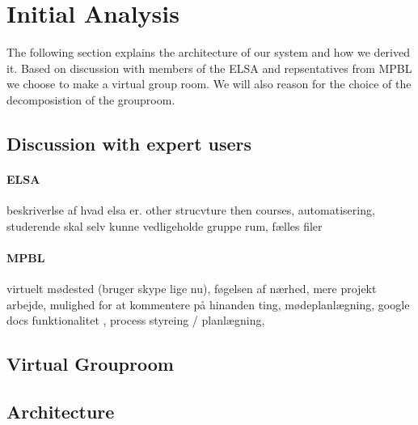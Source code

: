 \section{Initial Analysis}
\begin{comment}
In the preliminary phase of working with Electronic-learning (E-learning) it is important for us to ensure that we are in fact working with problems that are relevant in the E-learning and Problem Based Learning (PBL) fields of study, as we are aiming at improving the overall way that the chosen E-learning environment at Aalborg University (AAU), namely Moodle, supports PBL. Because AAU is renowned for its implementation of PBL, we do not have to look very far to find some of the leading experts in this field.
\end{comment}
The following section explains the architecture of our system and how we derived it. Based on discussion with members of the ELSA \cite{x} and repsentatives from MPBL \cite{y} we choose to make a virtual group room. We will also reason for the choice of the decomposistion of the grouproom.

\subsection{Discussion with expert users}   

\paragraph{ELSA}
beskriverlse af hvad elsa er.
other strucvture then courses, automatisering, studerende skal selv kunne vedligeholde gruppe rum, fælles filer

\paragraph{MPBL}
virtuelt mødested (bruger skype lige nu), føgelsen af nærhed, mere projekt arbejde, mulighed for at kommentere på hinanden ting, mødeplanlægning, google docs funktionalitet , process styreing / planlægning, 

\subsection{Virtual Grouproom}


\subsection{Architecture}

